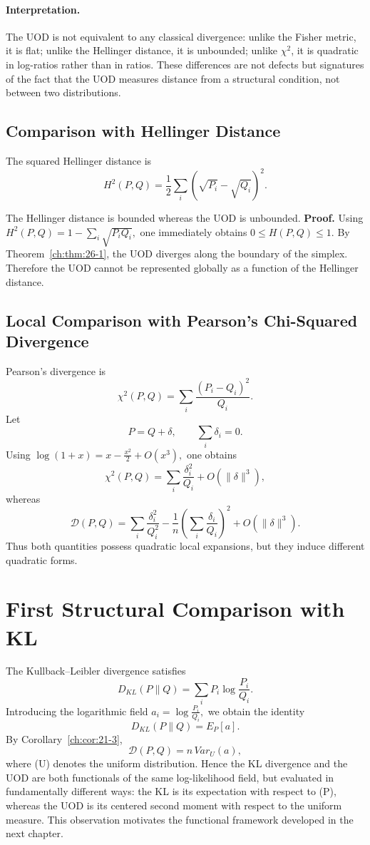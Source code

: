 \paragraph{Interpretation.}
The UOD is not equivalent to any classical divergence: unlike the Fisher metric, it is flat; unlike the Hellinger distance, it is unbounded; unlike $\chi^2$, it is quadratic in log-ratios rather than in ratios.  These differences are not defects but signatures of the fact that the UOD measures distance from a structural condition, not between two distributions.

\subsection{Comparison with Hellinger Distance}\label{ch:thm:26-2}
The squared Hellinger distance is
\[ H^{2}(P,Q)= \frac12
\sum_{i}(\sqrt{P_i}-\sqrt{Q_i})^{2}. \]
\begin{theorem}

The Hellinger distance is bounded whereas the UOD is unbounded.
\textbf{Proof.}
Using
$H^{2}(P,Q) = 1-\sum_{i}\sqrt{P_iQ_i},$
one immediately obtains $0\le H(P,Q)\le1.$
By Theorem~\ref{ch:thm:26-1}, the UOD diverges along
the boundary of the simplex. Therefore the UOD cannot be represented
globally as a function of the Hellinger distance. 
\end{theorem}
\subsection{Local Comparison with Pearson's Chi-Squared Divergence}\label{ch:sec:local-comparison-with-pearsons-chi-squared-divergence}
Pearson's divergence is
\[ \chi^{2}(P,Q) = \sum_{i}
\frac{(P_i-Q_i)^2}{Q_i}. \]
Let
\[ P=Q+\delta, \qquad
\sum_{i}\delta_{i}=0. \]
Using
$\log(1+x)=x-\frac{x^2}{2}+O(x^{3}),$
one obtains
\[ \chi^{2}(P,Q) = \sum_{i}
\frac{\delta_i^2}{Q_i} + O(\|\delta\|^{3}), \]
whereas
\[ \mathcal{D}(P,Q) = \sum_{i}
\frac{\delta_i^2}{Q_i^2} - \frac1n \left(
\sum_{i}\frac{\delta_i}{Q_i} \right)^{2} +
O(\|\delta\|^{3}). \]
Thus both quantities possess quadratic local expansions, but they induce
different quadratic forms.
\section{First Structural Comparison with KL}\label{ch:sec:first-structural-comparison-with-kl}
The Kullback--Leibler divergence satisfies
\[ D_{KL}(P\|Q) = \sum_{i} P_i
\log\frac{P_i}{Q_i}. \]
Introducing the logarithmic field
$a_i=\log\frac{P_i}{Q_i},$
we obtain the identity
\[ \boxed{
D_{KL}(P\|Q)=E_P[a].
} \]
By Corollary~\ref{ch:cor:21-3},
\[ \boxed{
\mathcal{D}(P,Q)
=
n\,Var_U(a),
} \]
where (U) denotes the uniform distribution.
Hence the KL divergence and the UOD are both functionals of the same
log-likelihood field, but evaluated in fundamentally different ways: the
KL is its expectation with respect to (P), whereas the UOD is its
centered second moment with respect to the uniform measure.
This observation motivates the functional framework developed in the
next chapter.
